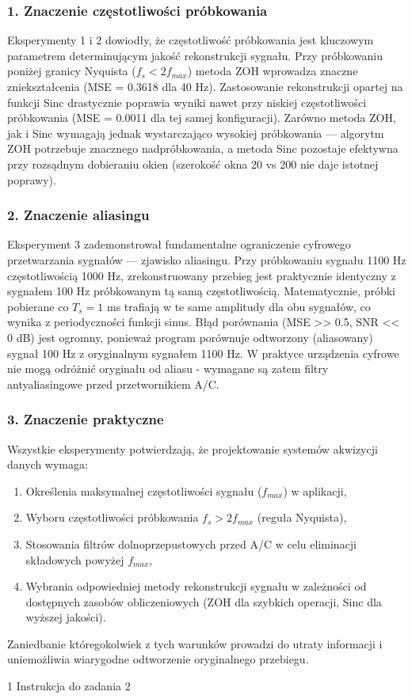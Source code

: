 \documentclass[12pt]{article}
\begin{document}
\subsubsection*{1. Znaczenie częstotliwości próbkowania}
Eksperymenty 1 i 2 dowiodły, że częstotliwość próbkowania jest kluczowym parametrem determinującym jakość rekonstrukcji sygnału. Przy próbkowaniu poniżej granicy Nyquista ($f_s < 2 f_{max}$) metoda ZOH wprowadza znaczne zniekształcenia (MSE = 0.3618 dla 40 Hz). Zastosowanie rekonstrukcji opartej na funkcji Sinc drastycznie poprawia wyniki nawet przy niskiej częstotliwości próbkowania (MSE = 0.0011 dla tej samej konfiguracji). Zarówno metoda ZOH, jak i Sinc wymagają jednak wystarczająco wysokiej próbkowania — algorytm ZOH potrzebuje znacznego nadpróbkowania, a metoda Sinc pozostaje efektywna przy rozsądnym dobieraniu okien (szerokość okna 20 vs 200 nie daje istotnej poprawy).

\subsubsection*{2. Znaczenie aliasingu}
Eksperyment 3 zademonstrował fundamentalne ograniczenie cyfrowego przetwarzania sygnałów — zjawisko aliasingu. Przy próbkowaniu sygnału 1100 Hz częstotliwością 1000 Hz, zrekonstruowany przebieg jest praktycznie identyczny z sygnałem 100 Hz próbkowanym tą samą częstotliwością. Matematycznie, próbki pobierane co $T_s = 1$ ms trafiają w te same amplitudy dla obu sygnałów, co wynika z periodyczności funkcji sinus. Błąd porównania (MSE >> 0.5, SNR << 0 dB) jest ogromny, ponieważ program porównuje odtworzony (aliasowany) sygnał 100 Hz z oryginalnym sygnałem 1100 Hz. W praktyce urządzenia cyfrowe nie mogą odróżnić oryginału od aliasu - wymagane są zatem filtry antyaliasingowe przed przetwornikiem A/C.

\subsubsection*{3. Znaczenie praktyczne}
Wszystkie eksperymenty potwierdzają, że projektowanie systemów akwizycji danych wymaga:
\begin{enumerate}
    \item Określenia maksymalnej częstotliwości sygnału ($f_{max}$) w aplikacji,
    \item Wyboru częstotliwości próbkowania $f_s > 2 f_{max}$ (reguła Nyquista),
    \item Stosowania filtrów dolnoprzepustowych przed A/C w celu eliminacji składowych powyżej $f_{max}$,
    \item Wybrania odpowiedniej metody rekonstrukcji sygnału w zależności od dostępnych zasobów obliczeniowych (ZOH dla szybkich operacji, Sinc dla wyższej jakości).
\end{enumerate}
Zaniedbanie któregokolwiek z tych warunków prowadzi do utraty informacji i uniemożliwia  wiarygodne odtworzenie oryginalnego przebiegu.


\begin{thebibliography}{1}
 Instrukcja do zadania 2
\end{thebibliography}
\end{document}
